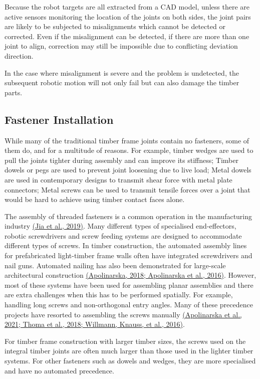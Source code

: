 \documentclass[11pt]{book}
\begin{document}
Because the robot targets are all extracted from a CAD model, unless there are active sensors monitoring the location of the joints on both sides, the joint pairs are likely to be subjected to misalignments which cannot be detected or corrected. Even if the misalignment can be detected, if there are more than one joint to align, correction may still be impossible due to conflicting deviation direction.

In the case where misalignment is severe and the problem is undetected, the subsequent robotic motion will not only fail but can also damage the timber parts. 

\subsection{Fastener Installation}

While many of the traditional timber frame joints contain no fasteners, some of them do, and for a multitude of reasons. For example, timber wedges are used to pull the joints tighter during assembly and can improve its stiffness; Timber dowels or pegs are used to prevent joint loosening due to live load; Metal dowels are used in contemporary designs to transmit shear force with metal plate connectors; Metal screws can be used to transmit tensile forces over a joint that would be hard to achieve using timber contact faces alone. 

The assembly of threaded fasteners is a common operation in the manufacturing industry \href{https://www.zotero.org/google-docs/?SLTLD9}{(Jia et al., 2019)}. Many different types of specialised end-effectors, robotic screwdrivers and screw feeding systems are designed to accommodate different types of screws. In timber construction, the automated assembly lines for prefabricated light-timber frame walls often have integrated screwdrivers and nail guns. Automated nailing has also been demonstrated for large-scale architectural construction \href{https://www.zotero.org/google-docs/?NCjCe0}{(Apolinarska, 2018; Apolinarska et al., 2016)}. However, most of these systems have been used for assembling planar assemblies and there are extra challenges when this has to be performed spatially. For example, handling long screws and non-orthogonal entry angles. Many of these precedence projects have resorted to assembling the screws manually \href{https://www.zotero.org/google-docs/?M7H4UY}{(Apolinarska et al., 2021; Thoma et al., 2018; Willmann, Knauss, et al., 2016)}. 

For timber frame construction with larger timber sizes, the screws used on the integral timber joints are often much larger than those used in the lighter timber systems. For other fasteners such as dowels and wedges, they are more specialised and have no automated precedence. 
\end{document}
